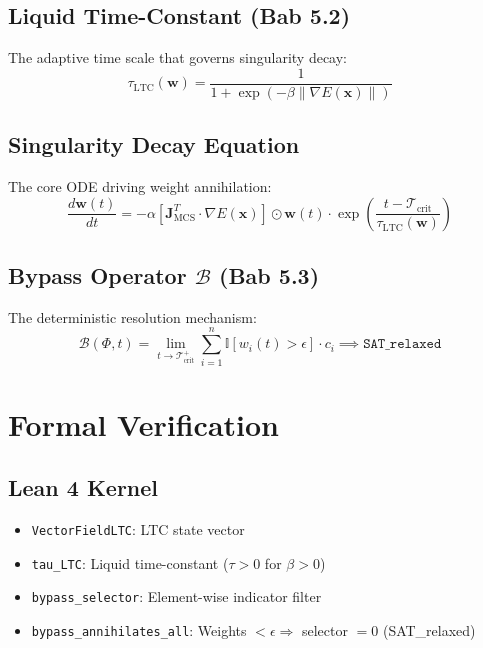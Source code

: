 \documentclass[12pt,a4paper]{article}
\begin{document}
\subsection{Liquid Time-Constant (Bab 5.2)}
The adaptive time scale that governs singularity decay:
\begin{equation}
  \tau_{\text{LTC}}(\mathbf{w}) = \frac{1}{1 + \exp(-\beta \|\nabla E(\mathbf{x})\|)}
\end{equation}

\subsection{Singularity Decay Equation}
The core ODE driving weight annihilation:
\begin{equation}
  \frac{d\mathbf{w}(t)}{dt} = -\alpha \left[\mathbf{J}_{\text{MCS}}^T \cdot \nabla E(\mathbf{x})\right] \odot \mathbf{w}(t) \cdot \exp\!\left(\frac{t - \mathcal{T}_{\text{crit}}}{\tau_{\text{LTC}}(\mathbf{w})}\right)
\end{equation}

\subsection{Bypass Operator $\mathcal{B}$ (Bab 5.3)}
The deterministic resolution mechanism:
\begin{equation}
  \mathcal{B}(\Phi, t) = \lim_{t \to \mathcal{T}_{\text{crit}}^+} \sum_{i=1}^{n} \mathbb{I}[w_i(t) > \epsilon] \cdot c_i \implies \texttt{SAT\_relaxed}
\end{equation}

\section{Formal Verification}

\subsection{Lean 4 Kernel}
\begin{itemize}
\item \texttt{VectorFieldLTC}: LTC state vector
\item \texttt{tau\_LTC}: Liquid time-constant ($\tau > 0$ for $\beta > 0$)
\item \texttt{bypass\_selector}: Element-wise indicator filter
\item \texttt{bypass\_annihilates\_all}: Weights $< \epsilon \Rightarrow$ selector $= 0$ (SAT\_relaxed)
\end{itemize}
\end{document}
